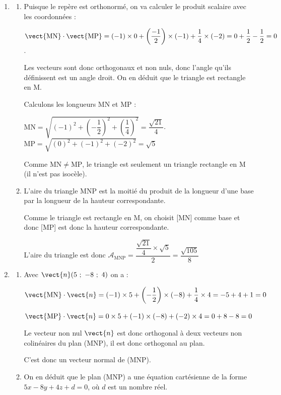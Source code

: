 \begin{enumerate}
\item
	\begin{enumerate}
		\item Puisque le repère est orthonormé, on va calculer le produit scalaire avec les coordonnées :

$\vect{\text{MN}} \cdot \vect{\text{MP}} = (-1)\times 0 + \left(\dfrac{-1}{2}\right) \times (-1) + \dfrac{1}{4}\times (-2) = 0 + \dfrac{1}{2} - \dfrac{1}{2} = 0 $.

Les vecteurs sont donc orthogonaux et non nuls, donc l'angle qu'ils définissent est un angle droit. On en déduit que le triangle est rectangle en M.

Calculons les longueurs MN et MP :

$\mathrm{MN} = \sqrt{\left(-1\right)^2+\left(-\dfrac{1}{2}\right)^2+\left(\dfrac{1}{4}\right)^2 } = \dfrac{\sqrt{21}}{4}$.
\qquad
$\mathrm{MP} = \sqrt{\left(0\right)^2+\left(-1\right)^2+\left(-2\right)^2} = \sqrt{5}$

Comme $\mathrm{MN} \neq \mathrm{MP}$, le triangle est seulement un triangle rectangle en M (il n'est pas isocèle).

	\item L'aire du triangle MNP est la moitié du produit de la longueur d'une base par la longueur de la hauteur correspondante.

Comme le triangle est rectangle en M, on choisit [MN] comme base et donc [MP] est donc la hauteur correspondante.

L'aire du triangle est donc $\mathcal{A}_{\mathrm{MNP}} = \dfrac{\dfrac{\sqrt{21}}{4}\times \sqrt{5}}{2} = \dfrac{\sqrt{105}}{8}$
	\end{enumerate}
\item
	\begin{enumerate}
		\item Avec $\vect{n}(5~;~-8~;~4)$ on a :

$\vect{\mathrm{MN}}\cdot \vect{n} = (-1)\times 5 + \left(-\dfrac{1}{2}\right) \times (-8) + \dfrac{1}{4} \times 4 = -5 + 4 + 1 = 0$

$\vect{\mathrm{MP}}\cdot \vect{n} = 0\times 5 + (-1) \times (-8) + (-2) \times 4 = 0 + 8 -8 = 0$

Le vecteur non nul $\vect{n}$ est donc orthogonal à deux vecteurs non colinéaires du plan (MNP), il est donc orthogonal au plan.

C'est donc un vecteur normal de (MNP).

\item On en déduit que le plan (MNP) a une équation cartésienne de la forme $5x - 8y + 4z + d= 0$, où $d$ est un nombre réel.


\end{enumerate}
\end{enumerate}
